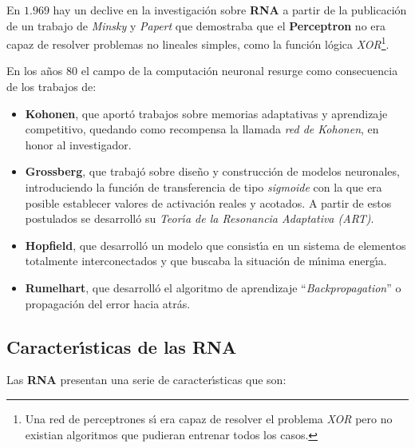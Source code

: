 En $1.969$ hay un declive en la investigaci\'on sobre \textbf{RNA} a partir de
la publicaci\'on de un trabajo de \emph{Minsky} y \emph{Papert} que demostraba
que el \textbf{Perceptron} no era capaz de resolver problemas no lineales
simples, como la funci\'on l\'ogica \emph{XOR}\footnote{Una red de perceptrones
s\'{\i} era capaz de resolver el problema \emph{XOR} pero no existian
algoritmos que pudieran entrenar todos los casos.}.

En los a\~nos $80$ el campo de la computaci\'on neuronal resurge como
consecuencia de los trabajos de:

\begin{itemize}
\item \textbf{Kohonen}, que aport\'o trabajos sobre memorias adaptativas y
aprendizaje competitivo, quedando como recompensa la llamada \emph{red de
Kohonen}, en honor al investigador.
\item \textbf{Grossberg}, que trabaj\'o sobre dise\~no y construcci\'on de
modelos neuronales, introduciendo la funci\'on de transferencia de tipo
\emph{sigmoide} con la que era posible establecer valores de activaci\'on
reales y acotados. A partir de estos postulados se desarroll\'o su
\emph{Teor\'{\i}a de la Resonancia Adaptativa (ART)}.
\item \textbf{Hopfield}, que desarroll\'o un modelo que consist\'{\i}a en un
sistema de elementos totalmente interconectados y que buscaba la situaci\'on de
m\'{\i}nima energ\'{\i}a.
\item \textbf{Rumelhart}, que desarroll\'o el algoritmo de aprendizaje
``\emph{Backpropagation}'' o propagaci\'on del error hacia atr\'as.
\end{itemize}
%
\newpage
%
\subsection{Caracter\'{\i}sticas de las RNA}

Las \textbf{RNA} presentan una serie de caracter\'{\i}sticas que son:

